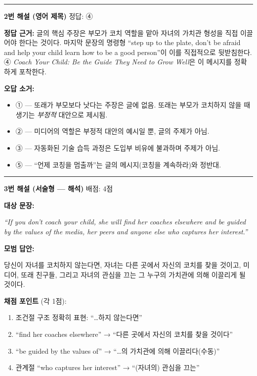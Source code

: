 \documentclass[11pt,a4paper]{article}
\begin{document}
\vspace{12pt}
\hrule
\vspace{10pt}

{\sffamily\bfseries 2번 해설 (영어 제목)} \hfill {\small 정답: ④}

\vspace{4pt}
\textbf{정답 근거:} 글의 핵심 주장은 부모가 코치 역할을 맡아 자녀의 가치관 형성을 직접
이끌어야 한다는 것이다. 마지막 문장의 명령형 ``step up to the plate, don't be afraid and
help your child learn how to be a good person''이 이를 직접적으로 뒷받침한다.
④ \textit{Coach Your Child: Be the Guide They Need to Grow Well}은 이 메시지를 정확하게
포착한다.

\vspace{6pt}
\textbf{오답 소거:}
\begin{itemize}[leftmargin=2em,itemsep=1pt]
  \item ① — 또래가 부모보다 낫다는 주장은 글에 없음. 또래는 부모가 코치하지 않을 때
  생기는 \textit{부정적} 대안으로 제시됨.
  \item ② — 미디어의 역할은 부정적 대안의 예시일 뿐, 글의 주제가 아님.
  \item ③ — 자동화된 기술 습득 과정은 도입부 비유에 불과하며 주제가 아님.
  \item ⑤ — ``언제 코칭을 멈출까''는 글의 메시지(코칭을 계속하라)와 정반대.
\end{itemize}

\vspace{12pt}
\hrule
\vspace{10pt}

{\sffamily\bfseries 3번 해설 (서술형 — 해석)} \hfill {\small 배점: 4점}

\vspace{4pt}
\textbf{대상 문장:}
\begin{pbox}
\itshape
``If you don't coach your child, she will find her coaches elsewhere and be guided by the
values of the media, her peers and anyone else who captures her interest.''
\end{pbox}

\vspace{6pt}
\textbf{모범 답안:}

당신이 자녀를 코치하지 않는다면, 자녀는 다른 곳에서 자신의 코치를 찾을 것이고,
미디어, 또래 친구들, 그리고 자녀의 관심을 끄는 그 누구의 가치관에 의해
이끌리게 될 것이다.

\vspace{8pt}
\textbf{채점 포인트} (각 1점):
\begin{enumerate}[leftmargin=2em,itemsep=2pt]
  \item 조건절 구조 정확히 표현: ``\ldots 하지 않는다면''
  \item ``find her coaches elsewhere'' → ``다른 곳에서 자신의 코치를 찾을 것이다''
  \item ``be guided by the values of'' → ``\ldots 의 가치관에 의해 이끌리다(수동)''
  \item 관계절 ``who captures her interest'' → ``(자녀의) 관심을 끄는''
\end{enumerate}
\end{document}
